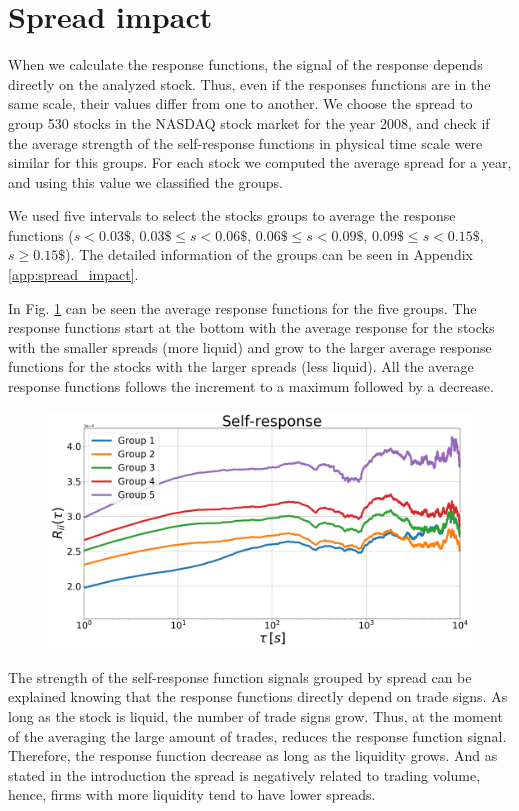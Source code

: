 \section{Spread impact}\label{sec:spread_impact}

When we calculate the response functions, the signal of the response depends
directly on the analyzed stock. Thus, even if the responses functions are in
the same scale, their values differ from one to another. We choose the spread
to group 530 stocks in the NASDAQ stock market for the year 2008, and check if
the average strength of the self-response functions in physical time scale were
similar for this groups. For each stock we computed the average spread for a
year, and using this value we classified the groups.

We used five intervals to select the stocks groups to average the response
functions ($s<0.03\$$, $0.03\$ \le s <0.06\$$, $0.06\$ \le s <0.09\$$,
$0.09\$ \le s <0.15\$$, $s \ge 0.15\$$). The detailed information of the groups
can be seen in Appendix \ref{app:spread_impact}.

In Fig. \ref{fig:spread_impact} can be seen the average response functions for
the five groups. The response functions start at the bottom with the average
response for the stocks with the smaller spreads (more liquid) and grow to the
larger average response functions for the stocks with the larger spreads (less
liquid). All the average response functions follows the increment to a maximum
followed by a decrease.

\begin{figure}[htbp]
    \centering
    \includegraphics[width=\columnwidth]{figures/06_spread_impact.png}
    \caption{}
    \label{fig:spread_impact}
\end{figure}

The strength of the self-response function signals grouped by spread can be
explained knowing that the response functions directly depend on trade signs.
As long as the stock is liquid, the number of trade signs grow. Thus, at the
moment of the averaging the large amount of trades, reduces the response
function signal. Therefore, the response function decrease as long as the
liquidity grows. And as stated in the introduction the spread is negatively
related to trading volume, hence, firms with more liquidity tend to have lower
spreads.
